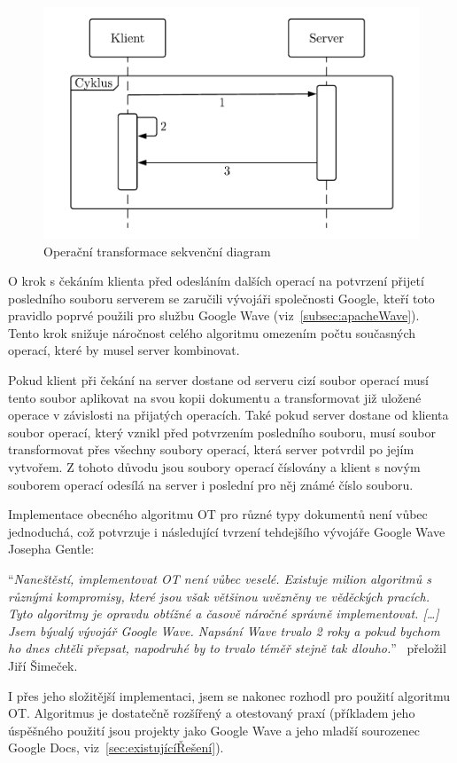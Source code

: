 \begin{figure}[ht]
    \centering
    \includegraphics[width=\textwidth]{partials/analyza/OP_diagram.pdf}
    \caption{Operační transformace sekvenční diagram}\label{fig:OP_diagram}
\end{figure}

O krok s čekáním klienta před odesláním dalších operací na potvrzení přijetí posledního souboru serverem se zaručili vývojáři společnosti Google, kteří toto pravidlo poprvé použili pro službu Google Wave (viz~\ref{subsec:apacheWave}).
Tento krok snižuje náročnost celého algoritmu omezením počtu současných operací, které by musel server kombinovat.~\cite{ot:waveAddition}

Pokud klient při čekání na server dostane od serveru cizí soubor operací musí tento soubor aplikovat na svou kopii dokumentu a transformovat již uložené operace v závislosti na přijatých operacích.
Také pokud server dostane od klienta soubor operací, který vznikl před potvrzením posledního souboru, musí soubor transformovat přes všechny soubory operací, která server potvrdil po jejím vytvořem.
Z tohoto důvodu jsou soubory operací číslovány a klient s novým souborem operací odesílá na server i poslední pro něj známé číslo souboru.

Implementace obecného algoritmu \gls{OT} pro různé typy dokumentů není vůbec jednoduchá, což potvrzuje i následující tvrzení tehdejšího vývojáře Google Wave Josepha Gentle:

\enquote{\textit{Naneštěstí, implementovat OT není vůbec veselé.
Existuje milion algoritmů s různými kompromisy, které jsou však většinou uvězněny ve věděckých pracích.
Tyto algoritmy je opravdu obtížné a časově náročné správně implementovat.
[\ldots]
Jsem bývalý vývojář Google Wave.
Napsání Wave trvalo 2 roky a pokud bychom ho dnes chtěli přepsat, napodruhé by to trvalo téměř stejně tak dlouho.}}~\cite{ot:sharejs} přeložil Jiří Šimeček.

I přes jeho složitější implementaci, jsem se nakonec rozhodl pro použití algoritmu \gls{OT}.
Algoritmus je dostatečně rozšířený a otestovaný praxí (příkladem jeho úspěšného použití jsou projekty jako Google Wave a jeho mladší sourozenec Google Docs, viz~\ref{sec:existujícíŘešení}).
